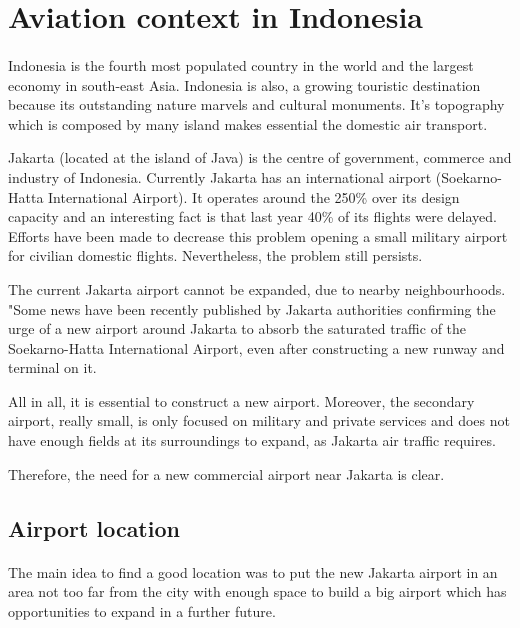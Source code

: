 \section{Aviation context in Indonesia}
\paragraph{} Indonesia is the fourth most populated country in the world and the largest economy in south-east Asia. Indonesia is also, a growing touristic destination because its outstanding nature marvels and cultural monuments. It’s topography which is composed by many island makes essential the domestic air transport.

Jakarta (located at the island of Java) is the centre of government, commerce and industry of Indonesia. Currently Jakarta has an international airport (Soekarno-Hatta International Airport). It operates around the 250\% over its design capacity and an interesting fact is that last year 40\% of its flights were delayed. Efforts have been made to decrease this problem opening a small military airport for civilian domestic flights. Nevertheless, the problem still persists. 

The current Jakarta airport cannot be expanded, due to nearby neighbourhoods. "Some news have been recently published by Jakarta authorities confirming the urge of a new airport around Jakarta to absorb the saturated traffic of the Soekarno-Hatta International Airport, even after constructing a new runway and terminal on it. 

All in all, it is essential to construct a new airport. Moreover, the secondary airport, really small, is only focused on military and private services and does not have enough fields at its surroundings to expand, as Jakarta air traffic requires. 

Therefore, the need for a new commercial airport near Jakarta is clear. 

	\subsection{Airport location}
\paragraph{}The main idea to find a good location was to put the new Jakarta airport in an area not too far from the city with enough space to build a big airport which has opportunities to expand in a further future.

